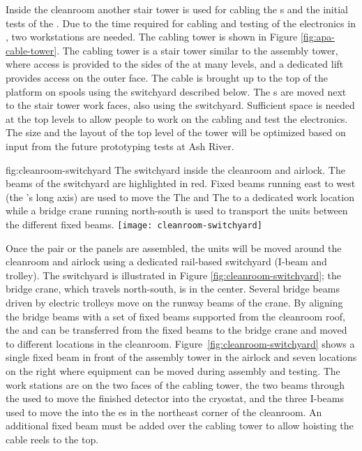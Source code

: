 Inside the cleanroom  another stair tower is used for cabling the s and the initial tests of the . Due to the time required for cabling and testing of the electronics in , %
two workstations are needed. The  cabling tower is shown in Figure \ref{fig:apa-cable-tower}. The  cabling tower is a stair tower similar to the  assembly tower, where access is provided to the sides of the  at many levels, and a dedicated lift provides access on the outer face. The cable is brought up to the top of the platform on spools using the switchyard described below. The s are moved next to the stair tower work faces, also using the switchyard.  Sufficient space is needed at the top levels to allow people to work on the cabling and test the electronics. The size and the layout of the top level of the tower will be optimized based on input from the future prototyping tests %
at Ash River. 

\begin{dunefigure}{fig:cleanroom-switchyard}
  {The switchyard inside the cleanroom and airlock. The beams of the switchyard are highlighted in red. Fixed beams running east to west (the 's long axis) are used to move the The  and The  to a dedicated work location while a bridge crane running north-south is used to transport the units between the different fixed beams. }
\texttt{[image: cleanroom-switchyard]}
\end{dunefigure}

Once the  pair or the  panels are assembled, the units will be moved around the cleanroom and airlock using a dedicated rail-based switchyard (I-beam and trolley). The switchyard is illustrated in Figure \ref{fig:cleanroom-switchyard}; %
the bridge crane, which travels north-south, is in the center. Several bridge beams driven by electric trolleys %
move on the runway beams of the crane.  By aligning the bridge beams with a set of fixed beams supported from the cleanroom roof, the  and  can be transferred from the fixed beams to the bridge crane and %
moved to different locations in the cleanroom. Figure~\ref{fig:cleanroom-switchyard} shows a single fixed beam in front of the  assembly tower in the airlock and seven locations on the right where equipment can be moved during assembly and testing. The work stations are on the two faces of the  cabling tower, the two beams through the   used to move the finished detector into the cryostat, and the three I-beams   used to move the  into the \coldbox{}es in the northeast corner of the cleanroom. An additional fixed beam must be added over the cabling tower to allow hoisting the cable reels %
to the top. 

